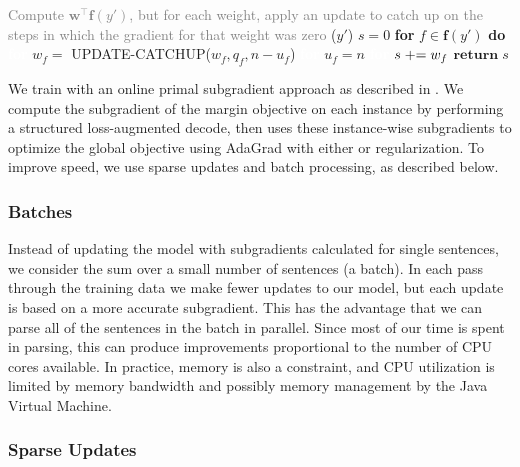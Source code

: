 \begin{algorithm}
\begin{multicols}{2}
\begin{algorithmic}[]
\begin{lefttopbot}[style=mdftight]
    \State \textcolor{gray}{Compute $\mathbf{w}^\top \mathbf{f}(y')$, but for each weight, apply an update to catch up on the steps in which the gradient for that weight was zero}
    ($y'$)
        \State $s = 0$
        \State \textbf{for} $f \in \mathbf{f}(y')$ \textbf{do}
        \State \textcolor{white}{\textbf{for}} $w_f = $ {\footnotesize UPDATE-CATCHUP}($w_f, q_f, n - u_f$)
        \State \textcolor{white}{\textbf{for}} $u_f = n$
        \State \textcolor{white}{\textbf{for}} $s \mathrel{+}= w_f$
        \State $\mathbf{return} \; s$
    \EndMyFunction
    \vspace{-3mm}
    \end{lefttopbot}
\end{algorithmic}
\end{multicols}
\vspace{-8mm}
\end{algorithm}

We train with an online primal subgradient approach \parencite{Ratliff:2007} as described in \textcite{Kummerfeld-etal:2015:EMNLP}.
We compute the subgradient of the margin objective on each instance by performing a structured loss-augmented decode, then uses these instance-wise subgradients to optimize the global objective using AdaGrad \parencite{Duchi:2011} with either \Lone or \Ltwo regularization.
To improve speed, we use sparse updates and batch processing, as described below.

\subsubsection{Batches}

Instead of updating the model with subgradients calculated for single sentences, we consider the sum over a small number of sentences (a batch).
In each pass through the training data we make fewer updates to our model, but each update is based on a more accurate subgradient.
This has the advantage that we can parse all of the sentences in the batch in parallel.
Since most of our time is spent in parsing, this can produce improvements proportional to the number of CPU cores available.
In practice, memory is also a constraint, and CPU utilization is limited by memory bandwidth and possibly memory management by the Java Virtual Machine.

\subsubsection{Sparse Updates}

